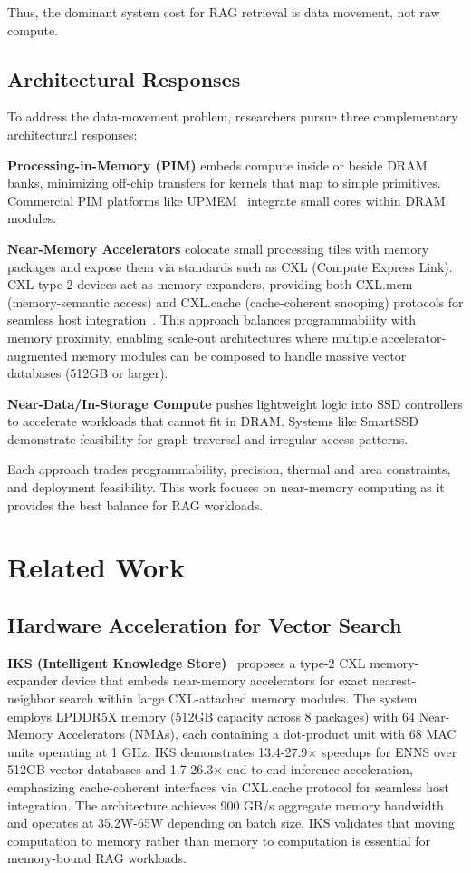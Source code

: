 \documentclass[conference]{IEEEtran}
\begin{document}
Thus, the dominant system cost for RAG retrieval is data movement, not raw compute.

\subsection{Architectural Responses}

To address the data-movement problem, researchers pursue three complementary architectural responses:

\textbf{Processing-in-Memory (PIM)} embeds compute inside or beside DRAM banks, minimizing off-chip transfers for kernels that map to simple primitives. Commercial PIM platforms like UPMEM~\cite{upmem} integrate small cores within DRAM modules.

\textbf{Near-Memory Accelerators} colocate small processing tiles with memory packages and expose them via standards such as CXL (Compute Express Link). CXL type-2 devices act as memory expanders, providing both CXL.mem (memory-semantic access) and CXL.cache (cache-coherent snooping) protocols for seamless host integration~\cite{iks2023}. This approach balances programmability with memory proximity, enabling scale-out architectures where multiple accelerator-augmented memory modules can be composed to handle massive vector databases (512GB or larger).

\textbf{Near-Data/In-Storage Compute} pushes lightweight logic into SSD controllers to accelerate workloads that cannot fit in DRAM. Systems like SmartSSD demonstrate feasibility for graph traversal and irregular access patterns.

Each approach trades programmability, precision, thermal and area constraints, and deployment feasibility. This work focuses on near-memory computing as it provides the best balance for RAG workloads.

\section{Related Work}

\subsection{Hardware Acceleration for Vector Search}

\textbf{IKS (Intelligent Knowledge Store)}~\cite{iks2023} proposes a type-2 CXL memory-expander device that embeds near-memory accelerators for exact nearest-neighbor search within large CXL-attached memory modules. The system employs LPDDR5X memory (512GB capacity across 8 packages) with 64 Near-Memory Accelerators (NMAs), each containing a dot-product unit with 68 MAC units operating at 1 GHz. IKS demonstrates 13.4-27.9$\times$ speedups for ENNS over 512GB vector databases and 1.7-26.3$\times$ end-to-end inference acceleration, emphasizing cache-coherent interfaces via CXL.cache protocol for seamless host integration. The architecture achieves 900 GB/s aggregate memory bandwidth and operates at 35.2W-65W depending on batch size. IKS validates that moving computation to memory rather than memory to computation is essential for memory-bound RAG workloads.
\end{document}
